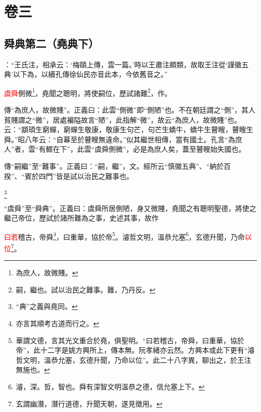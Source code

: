 

\chapter{卷三}


\section{舜典第二（堯典下）}


 {\noindent{}\fzbyks {}：“王氏注，相承云：‘梅頤上傳，雲一篇。’時以王肅注頗類，故取王注從‘謹徽五典’以下為，以續孔傳徐仙民亦音此本，今依舊音之。” \par}

\textcolor{red}{虞舜}側微\footnote{為庶人，故微賤。}，堯聞之聰明，將使嗣位，歷試諸難\footnote{嗣，繼也。試以治民之難事。難，乃丹反。}，作\CJKunderwave{\textcolor{red}{舜典}}。

{\noindent\zhuan{}\fzbyks 傳“為庶人，故微賤”。正義曰：此雲“側微”即“側陋”也。不在朝廷謂之“側”，其人貧賤謂之“微”，居處褊隘故言“陋”，此指解“微”，故云“為庶人，故微賤”也。云：“顓頊生窮蟬，窮蟬生敬康，敬康生句芒，句芒生蟜牛，蟜牛生瞽瞍，瞽瞍生舜。”昭八年云：“自幕至於瞽瞍無違命。”似其繼世相傳，當有國土。孔言“為庶人”者，雲“有鰥在下”，此雲“虞舜側微”，必是為庶人矣，蓋至瞽瞍始失國也。 \par}

{\noindent\zhuan{}\fzbyks 傳“嗣繼”至“難事”。正義曰：“嗣，繼”，文。經所云“慎徽五典”、“納於百揆”、“賓於四門”皆是試以治民之難事也。 \par}

\footnote{“典”之義與堯同。}

{\noindent\shu{}\fzkt “虞舜”至“舜典”。正義曰：虞舜所居側陋，身又微賤，堯聞之有聰明聖德，將使之繼己帝位，歷試於諸所難為之事，史述其事，故作 \par}

\textcolor{red}{曰若}稽古，帝舜\footnote{亦言其順考古道而行之。}，曰重華，協於帝\footnote{華謂文德，言其光文重合於堯，俱聖明。“曰若稽古，帝舜，曰重華，協於帝”，此十二字是姚方興所上，傳本無。阮孝緒亦云然。方興本或此下更有“濬哲文明，溫恭允塞，玄德升聞，乃命以位”。此二十八字異，聊出之，於王注無施也。}。濬哲文明，溫恭允塞\footnote{濬，深。哲，智也。舜有深智文明溫恭之德，信允塞上下。}，玄德升聞，乃命\textcolor{red}{以位}\footnote{玄謂幽潛，潛行道德，升聞天朝，遂見徵用。}。

